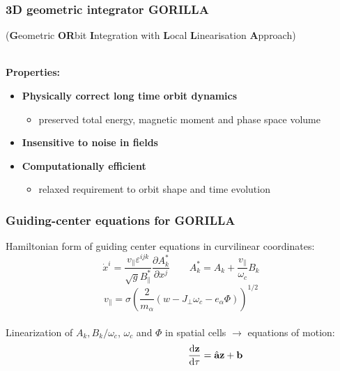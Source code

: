 \documentclass{beamer}
\newcommand{\be}[1]{\begin{equation} \label{#1}}
\newcommand{\ee}{\end{equation}}
\newcommand{\difp}[2]{\frac{\partial #1}{\partial #2}}
\newcommand{\rd}{{\rm d}}
\begin{document}
\begin{frame}
\frametitle{3D geometric integrator \textbf{GORILLA}}
\vspace{-0.8cm}
\begin{scriptsize}
	  (\textbf{G}eometric \textbf{OR}bit \textbf{I}ntegration with \textbf{L}ocal \textbf{L}inearisation \textbf{A}pproach)
\end{scriptsize}
\vspace{0.5cm}\\
\textbf{Properties:}
\vspace{-0.0cm}
\begin{itemize}
	\item \textbf{Physically correct long time orbit dynamics}
	\begin{itemize}
		\item preserved total energy, magnetic moment and phase space volume
	\end{itemize}
	\item \textbf{Insensitive to noise in fields}
	\item \textbf{Computationally efficient}
		\begin{itemize}
			\item relaxed requirement to orbit shape and time evolution
		\end{itemize}
\end{itemize}
\end{frame}

\begin{frame}
\frametitle{Guiding-center equations for \textbf{GORILLA}}
\vspace{-0.5cm}
Hamiltonian form of guiding center equations in curvilinear coordinates:
\vspace{-0.05cm}\\
\be{eqm_curv}
\dot x^i = \frac{v_\parallel \varepsilon^{ijk}}{\sqrt{g} B_\parallel^\ast}\difp{A^\ast_k}{x^j} \qquad A^\ast_k = A_k + \frac{v_\parallel}{\omega_c}B_k
\ee
\be{}
v_\parallel=\sigma \left(\frac{2}{m_\alpha}\left(w-J_\perp\omega_c-e_\alpha\Phi\right)\right)^{1/2}
\ee
\vspace{0.075cm}\\
Linearization of $A_k, B_k/ \omega_c$, $\omega_c$ and $\Phi$ in spatial cells \newline$\rightarrow$ equations of motion:
\vspace{-0.5cm}
\be{}
\hspace{2.5cm}\frac{\rd \textbf{z}}{\rd \tau} = \hat{\textbf{a}}\textbf{z} + \textbf{b}
\ee
\end{frame}
\end{document}
